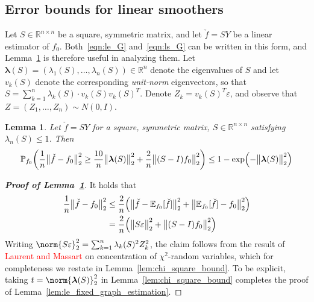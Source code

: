\documentclass{article}
\newcommand{\Reals}{\mathbb{R}}
\newcommand{\1}{\mathbf{1}}
\newcommand{\lambdavec}{\boldsymbol{\lambda}}
\newcommand{\Id}{I}
\newcommand{\Pbb}{\mathbb{P}}
\newcommand{\Ebb}{\mathbb{E}}
\theoremstyle{alden}
\theoremstyle{aldenthm}
\newtheorem{lemma}{Lemma}
\theoremstyle{definition}
\theoremstyle{remark}
\begin{document}
\subsection{Error bounds for linear smoothers}
Let $S \in \Reals^{n \times n}$ be a square, symmetric matrix, and let $\check{f} = SY$ be a linear estimator of $f_0$. Both~\eqref{eqn:le_G} and~\eqref{eqn:ls_G} can be written in this form, and Lemma~\ref{lem:linear_smoother_fixed_graph_estimation} is therefore useful in analyzing them. Let $\lambdavec(S) = (\lambda_1(S),\ldots,\lambda_n(S)) \in \Reals^n$ denote the eigenvalues of $S$ and let $v_k(S)$ denote the corresponding \emph{unit-norm} eigenvectors, so that $S = \sum_{k = 1}^{n} \lambda_k(S) \cdot v_k(S) v_k(S)^T$. Denote $Z_k = v_k(S)^T \varepsilon$, and observe that $Z = (Z_1,\ldots,Z_n) \sim N(0,\Id)$. 

\begin{lemma}
	\label{lem:linear_smoother_fixed_graph_estimation}
	Let $\check{f} = SY$ for a square, symmetric matrix, $S \in \Reals^{n \times n}$ satisfying $\lambda_n(S) \leq 1$. Then
	\begin{equation*}
	\Pbb_{f_0}\biggl(\frac{1}{n}\bigl\|\check{f} - f_0\bigr\|_2^2 \geq \frac{10}{n} \bigl\|\lambdavec(S)\bigr\|_2^2 + \frac{2}{n}\bigl\|(S - I)f_0\bigr\|_2^2\biggr) \leq 1 - \exp\Bigl(-\bigl\|\lambdavec(S)\bigr\|_2^2\Bigr)
	\end{equation*}
\end{lemma}
\begin{proof}[\textbf{Proof of Lemma~\ref{lem:linear_smoother_fixed_graph_estimation}}]
	It holds that
	\begin{align*}
	\frac{1}{n}\bigl\|\check{f} - f_0\bigr\|_2^2 & \leq \frac{2}{n}\Bigl(\bigl\|\check{f} - \Ebb_{f_0}[\check{f}]\bigr\|_2^2 + \bigl\|\Ebb_{f_0}[\check{f}] - f_0\bigr\|_2^2\Bigr) \\ 
	& = \frac{2}{n}\Bigl(\bigl\|S\varepsilon\bigr\|_2^2 + \bigl\|(S - I)f_0\bigr\|_2^2\Bigr)
	\end{align*}
	Writing $\norm{S\varepsilon}_2^2 = \sum_{k = 1}^{n} \lambda_k(S)^2 Z_k^2$, the claim follows from the result of \textcolor{red}{Laurent and Massart} on concentration of $\chi^2$-random variables, which for completeness we restate in Lemma~\ref{lem:chi_square_bound}. To be explicit, taking $t = \norm{\lambdavec(S)}_2^2$ in Lemma~\ref{lem:chi_square_bound} completes the proof of Lemma~\ref{lem:le_fixed_graph_estimation}.
\end{proof}
\end{document}
